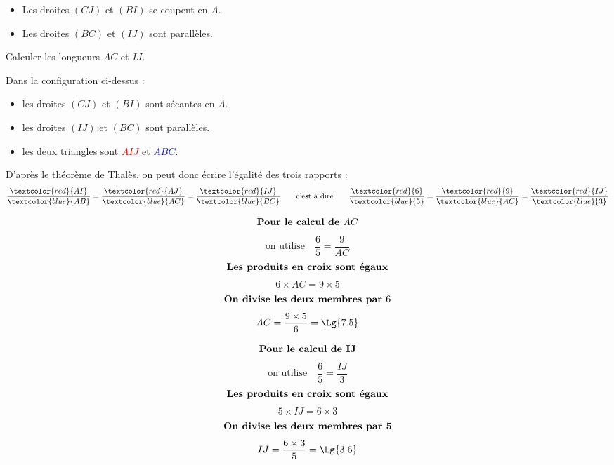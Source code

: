 \begin{methode*1}
\begin{changemargin}{0mm}{-10mm}
\begin{minipage}{0.6\linewidth}
                \end{minipage}
                \begin{minipage}{0.5\linewidth}
                    \begin{itemize}
                        \item Les droites $(CJ)$ et $(BI)$ se coupent en $A$.
                        \item Les droites $(BC)$ et $(IJ)$ sont parallèles.
                    \end{itemize}
                    Calculer les longueurs $AC$ et $IJ$.
                \end{minipage}
            \end{changemargin}
            \correction
            Dans la configuration ci-dessus : 
            \begin{itemize}
                \item les droites $(CJ)$ et $(BI)$ sont sécantes en $A$.
                \item les droites $(IJ)$ et $(BC)$ sont parallèles.
                \item les deux triangles sont \textcolor{red}{$AIJ$} et \textcolor{blue}{$ABC$}.
            \end{itemize}
            D'après le théorème de Thalès, on peut donc écrire l'égalité des trois rapports :
            $$\frac{\textcolor{red}{AI}}{\textcolor{blue}{AB}}=\frac{\textcolor{red}{AJ}}{\textcolor{blue}{AC}}=\frac{\textcolor{red}{IJ}}{\textcolor{blue}{BC}}\qquad\mbox{c'est à dire}\qquad\frac{\textcolor{red}{6}}{\textcolor{blue}{5}}=\frac{\textcolor{red}{9}}{\textcolor{blue}{AC}}=\frac{\textcolor{red}{IJ}}{\textcolor{blue}{3}}$$

            \begin{minipage}{8cm}
                $$\mbox{\bf Pour le calcul de $AC$}$$
                $$\mbox{on utilise} \quad \dfrac{6}{5}=\dfrac{9}{AC}$$
                $$\mbox{\bf Les produits en croix sont égaux}$$
                $$6\times AC=9\times5$$
                $$\mbox{\bf On divise les deux membres par $6$}$$
                $$AC=\frac{9\times5}{6}=\Lg{7.5}$$
            \end{minipage}
            \vrule
            \begin{minipage}{8cm}                
                $$\mbox{\bf Pour le calcul de IJ}$$
                $$\mbox{on utilise} \quad \dfrac{6}{5}=\dfrac{IJ}{3}$$
                $$\mbox{\bf Les produits en croix sont égaux}$$                
                $$5\times IJ=6\times3$$
                $$\mbox{\bf On divise les deux membres par 5}$$
                $$IJ=\frac{6\times3}{5}=\Lg{3.6}$$                
            \end{minipage}
        \end{methode*1}
        \vfill\phantom{rrr}

